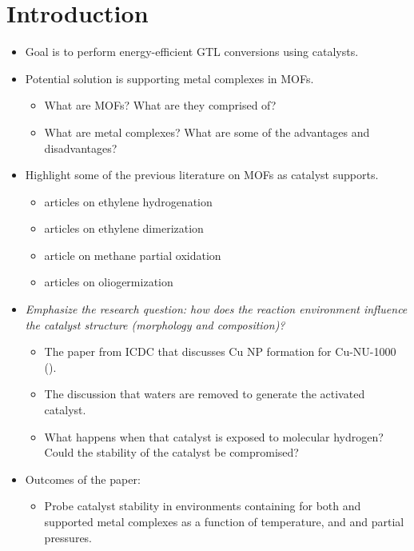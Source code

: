 \documentclass[journal=jctcce,manuscript=article]{achemso}
\begin{document}
\section{Introduction}
\begin{itemize}
    \item Goal is to perform energy-efficient GTL conversions using catalysts. 
    \item Potential solution is supporting metal complexes in MOFs.
    \begin{itemize}
        \item What are MOFs? What are they comprised of?
        \item What are metal complexes? What are some of the advantages and disadvantages? 
    \end{itemize}
    \item Highlight some of the previous literature on MOFs as catalyst supports. 
    \begin{itemize}
        \item articles on ethylene hydrogenation
        \item articles on ethylene dimerization 
        \item article on methane partial oxidation
        \item articles on oliogermization 
    \end{itemize}
    \item \emph{Emphasize the research question: how does the reaction environment influence the catalyst structure (morphology and composition)?}
    \begin{itemize}
        \item The paper from ICDC that discusses Cu NP formation for Cu-NU-1000 (\citeauthor{Halder2020}).
        \item The discussion that waters are removed to generate the activated catalyst. 
        \item What happens when that catalyst is exposed to molecular hydrogen? Could the stability of the catalyst be compromised?
    \end{itemize}
    \item Outcomes of the paper:
    \begin{itemize}
        \item Probe catalyst stability in environments containing  for both  and  supported metal complexes as a function of temperature, and  and  partial pressures. 
    \end{itemize}
\end{itemize}
\end{document}
